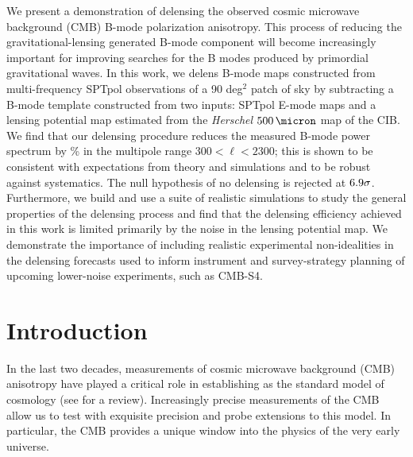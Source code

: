 
\newcommand{\sptpol}{SPTpol\xspace}


We present a demonstration of delensing the observed cosmic microwave background (CMB) B-mode polarization anisotropy.
This process of reducing the gravitational-lensing generated B-mode component will become increasingly important for improving searches for the B modes produced by primordial gravitational waves.
In this work, we delens B-mode maps constructed from multi-frequency \sptpol observations of a 90 deg$^2$ patch of sky by subtracting a B-mode template constructed from two inputs: \sptpol E-mode maps and a lensing potential map estimated from the \textit{Herschel} $500\,\micron$ map of the CIB.
We find that our delensing procedure reduces the measured B-mode power spectrum by \effData\% in the multipole range $300 < \ell < 2300$;
this is shown to be consistent with expectations from theory and simulations and to be robust against systematics.
The null hypothesis of no delensing is rejected at $6.9\sigma$.
Furthermore, we build and use a suite of realistic simulations to study the general properties of the delensing process and find that the delensing efficiency achieved in this work is limited primarily by the noise in the lensing potential map.
We demonstrate the importance of including realistic experimental non-idealities in the delensing forecasts used to inform instrument and survey-strategy planning of upcoming lower-noise experiments, such as CMB-S4.

\section{Introduction}

In the last two decades, measurements of cosmic microwave background (CMB) anisotropy have played a critical role in establishing \LCDM as the standard model of cosmology (see \citealt{hu02b} for a review).
Increasingly precise measurements of the CMB allow us to test \LCDM with exquisite precision and probe extensions to this model.
In particular, the CMB provides a unique window into the physics of the very early universe.

